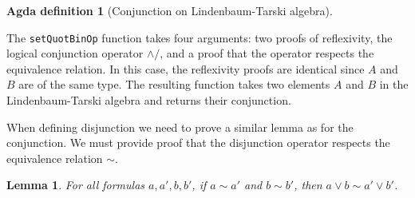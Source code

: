 \documentclass[titlepage]{article}
\newtheorem{lemma}{Lemma}[section]
\newtheorem{agdadef}{Agda definition}
\begin{document}
\begin{agdadef}[Conjunction on Lindenbaum-Tarski algebra]$ $
\end{agdadef}


The \texttt{setQuotBinOp} function takes four arguments: two proofs of reflexivity, the logical conjunction operator $\wedge/$, and a proof that the operator respects the equivalence relation. In this case, the reflexivity proofs are identical since $A$ and $B$ are of the same type. The resulting function takes two elements $A$ and $B$ in the Lindenbaum-Tarski algebra and returns their conjunction.

When defining disjunction we need to prove a similar lemma as for the conjunction. We must provide proof that the disjunction operator respects the equivalence relation $\sim$.

\begin{lemma}
    For all formulas $a,a',b,b'$, if $a\sim a'$ and $b \sim b'$, then $a \vee b \sim a' \vee b'$.
\end{lemma}
\end{document}
